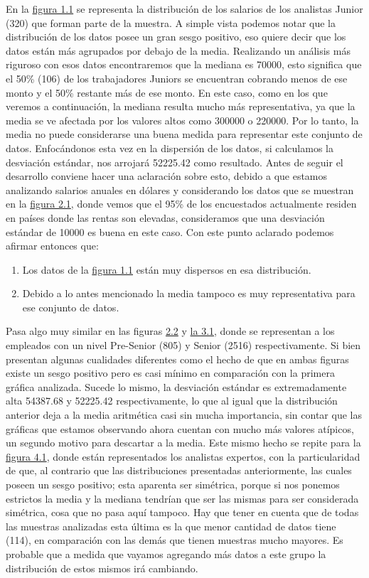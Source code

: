 \documentclass{article}
\begin{document}
	En la \hyperref[figura 1.1 diagrama]{figura 1.1} se representa la distribución de los salarios de los analistas Junior (320) que forman parte de la muestra. A simple vista podemos notar que la distribución de los datos posee un gran sesgo positivo, eso quiere decir que los datos están más agrupados por debajo de la media.
Realizando un análisis más riguroso con esos datos encontraremos que la mediana es 70000, esto significa que el 50\% (106) de los trabajadores Juniors se encuentran cobrando menos de ese monto y el 50\% restante más de ese monto. En este caso, como en los que veremos a continuación, la mediana resulta mucho más representativa, ya que la media se ve afectada por los valores altos como 300000 o 220000. Por lo tanto, la media no puede considerarse una buena medida para representar este conjunto de datos.
Enfocándonos esta vez en la dispersión de los datos, si calculamos la desviación estándar, nos arrojará 52225.42 como resultado. Antes de seguir el desarrollo conviene hacer una aclaración sobre esto, debido a que estamos analizando salarios anuales en dólares y considerando los datos que se muestran en la 
 \hyperref[figura2.1 torta]{figura 2.1}, donde vemos que el 95\% de los encuestados actualmente residen en países donde las rentas son elevadas, consideramos que una desviación estándar de 10000 es buena en este caso.
	Con este punto aclarado podemos afirmar entonces que: 
	\begin{enumerate}
		\item Los datos de la \hyperref[figura 1.1 diagrama]{figura 1.1} están muy dispersos en esa distribución.
		\item Debido a lo antes mencionado la media tampoco es muy representativa para ese conjunto de datos.
	\end{enumerate}
Pasa algo muy similar en las figuras \hyperref[figura 2.2 diagrama]{2.2} y \hyperref[figura 3.1 diagrama]{la 3.1}, donde se representan a los empleados con un nivel Pre-Senior (805) y Senior (2516) respectivamente. Si bien presentan algunas cualidades diferentes como el hecho de que en ambas figuras existe un sesgo positivo pero es casi mínimo en comparación con la primera gráfica analizada. Sucede lo mismo, la desviación estándar es extremadamente alta 54387.68 y 52225.42 respectivamente, lo que al igual que la distribución anterior deja a la media aritmética casi sin mucha importancia, sin contar que las gráficas que estamos observando ahora cuentan con mucho más valores atípicos, un segundo motivo para descartar a la media.
 Este mismo hecho se repite para la \hyperref[figura 4.1 diagrama]{figura 4.1}, donde están representados los analistas expertos, con la particularidad de que, al contrario que las distribuciones presentadas anteriormente, las cuales poseen un sesgo positivo; esta aparenta ser simétrica, porque si nos ponemos estrictos la media y la mediana tendrían que ser las mismas para ser considerada simétrica, cosa que no pasa aquí tampoco. Hay que tener en cuenta que de todas las muestras analizadas esta última es la que menor cantidad de datos tiene (114), en comparación con las demás que tienen muestras mucho mayores. Es probable que a medida que vayamos agregando más datos a este grupo la distribución de estos mismos irá cambiando.
\end{document}
